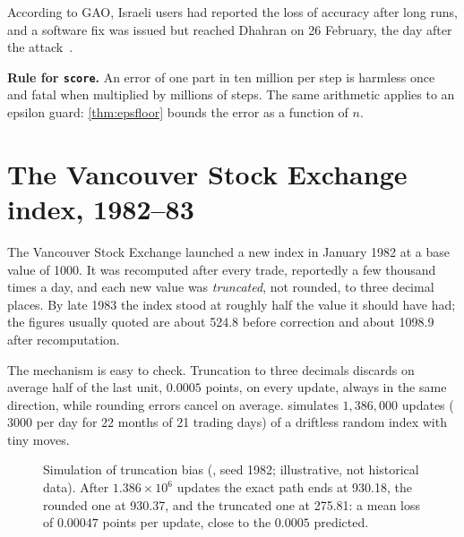 According to GAO, Israeli users had reported the loss of accuracy after long runs, and a software fix was issued but reached
Dhahran on 26 February, the day after the attack~\cite{gao1992patriot}.

\textbf{Rule for \texttt{score}.} An error of one part in ten million per step is harmless once and fatal when multiplied by
millions of steps. The same arithmetic applies to an epsilon guard: \cref{thm:epsfloor} bounds the error as a function of $n$.

\section{The Vancouver Stock Exchange index, 1982--83}\label{sec:hist-vse}
The Vancouver Stock Exchange launched a new index in January 1982 at a base value of 1000. It was recomputed after every
trade, reportedly a few thousand times a day, and each new value was \emph{truncated}, not rounded, to three decimal
places. By late 1983 the index stood at roughly half the value it should have had; the figures usually quoted are about
524.8 before correction and about 1098.9 after recomputation.

The mechanism is easy to check. Truncation to three decimals discards on average half of the last unit, $0.0005$ points,
on every update, always in the same direction, while rounding errors cancel on average.  simulates
$1{,}386{,}000$ updates ($3000$ per day for 22 months of 21 trading days) of a driftless random index with tiny moves.

\begin{figure}[htbp]
\centering
{}
\caption{Simulation of truncation bias (, seed 1982; illustrative, not historical data).
After $1.386\times10^6$ updates the exact path ends at 930.18, the rounded one at 930.37, and the truncated one at 275.81:
a mean loss of $0.00047$ points per update, close to the $0.0005$ predicted.}
\label{fig:vse}
\end{figure}

